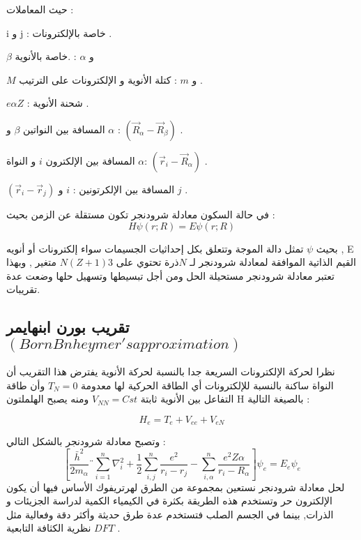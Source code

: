 حيث المعاملات :
\begin{list}{}{}
	
	\item 
	i و j : خاصة بالإلكترونات .
	\item 
	$ \beta $ و  $ \alpha $ :  .خاصة بالأنوية
	\item 
	 $ M $ و $ m $ : كتلة الأنوية  و الإلكترونات على الترتيب .
	\item 
	 $ e \alpha Z $  : شحنة الأنوية .
	\item 
	المسافة بين النواتين $ \beta $ و  $ \alpha $  : $(\vec{R}_{\alpha} - \vec{R}_{\beta})$	.
	\item 
	المسافة بين الإلكترون $ i $ و النواة $ \alpha $: $(\vec{r}_{i} - \vec{R}_{\alpha})$ 	. 
	\item 
	$(\vec{r}_{i} - \vec{r}_{j})$	المسافة  بين الإلكرتونين : $ i $ و $ j $ . 
\end{list}

في حالة السكون معادلة  شرودنجر تكون مستقلة عن الزمن بحيث :
\begin{equation}\label{}
	H \psi (r;R) = E \psi (r;R)
\end{equation}

بحيث $\psi$ تمثل دالة الموجة وتتعلق بكل إحداثيات الجسيمات سواء إلكترونات أو أنويه , E  القيم الذاتية الموافقة لمعادلة شرودنجر لـ  $ N $ذرة تحتوي على $  N ( Z + 1 )3 $ متغير , وبهذا تعتبر معادلة  شرودنجر مستحيلة الحل ومن أجل تبسيطها وتسهيل حلها وضعت عدة تقريبات.


\subsection{ تقريب بورن ابنهايمر $ ( Born Bnheymer's approximation ) $ }

نظرا لحركة الإلكترونات السريعة جدا بالنسبة لحركة الأنوية  يفترض هذا التقريب أن  النواة ساكنة بالنسبة للإلكترونات أي الطاقة الحركية لها معدومة  $T_{N} = 0$ وأن طاقة التفاعل بين الأنوية ثابتة $ V_{NN} = Cst $ ومنه يصبح الهلملتون H بالصيغة التالية :

\begin{equation}\label{}
	H_{e} = T_{e} + V_{ee} + V_{eN}
\end{equation}

وتصبح معادلة شرودنجر بالشكل التالي :
\begin{equation}\label{}
	\left[\frac{ \bar{h} ^{2}  }{ 2m_{\alpha} }¨\sum_{i=1}^n  \nabla_{i}^{2} + \dfrac{1}{2} \sum_{i , j}^n \dfrac{e^{2}}{r_{i} - r_{j}} - \sum_{i , \alpha}^n \dfrac {e^{2} Z \alpha }{r_{i} - R_{\alpha}}\right] \psi_{e} = E_{e} \psi_{e}
\end{equation}
لحل معادلة  شرودنجر نستعين بمجموعة من الطرق لهرتريفوك  الأساس فيها أن يكون الإلكترون  حر وتستخدم هذه الطريقة بكثرة في الكيمياء الكمية لدراسة الجزيئات و الذرات, بينما في الجسم الصلب فتستخدم عدة طرق حديثة وأكثر دقة وفعالية مثل نظرية الكثافة التابعية  $ DFT $ .

